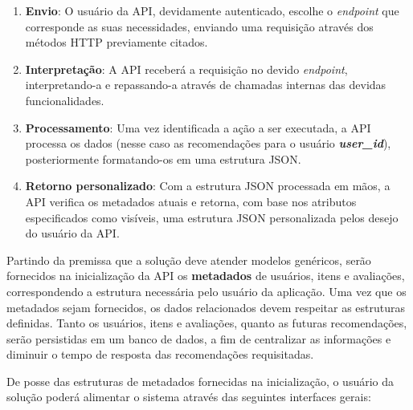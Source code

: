 \documentclass[12pt, openright, oneside, a4paper, brazil]{abntex2}
\begin{document}
\begin{enumerate}
	\item \textbf{Envio}: O usuário da API, devidamente autenticado, escolhe o \textit{endpoint} que corresponde as suas necessidades, enviando uma requisição através dos métodos HTTP previamente citados.

	\item \textbf{Interpretação}: A API receberá a requisição no devido \textit{endpoint}, interpretando-a e repassando-a através de chamadas internas das devidas funcionalidades.

	\item \textbf{Processamento}: Uma vez identificada a ação a ser executada, a API processa os dados (nesse caso as recomendações para o usuário \textbf{\textit{user\_id}}), posteriormente formatando-os em uma estrutura JSON.

	\item \textbf{Retorno personalizado}: Com a estrutura JSON processada em mãos, a API verifica os metadados atuais e retorna, com base nos atributos especificados como visíveis, uma estrutura JSON personalizada pelos desejo do usuário da API.
\end{enumerate}

Partindo da premissa que a solução deve atender modelos genéricos, serão fornecidos na inicialização da API os \textbf{metadados} de usuários, itens e avaliações, correspondendo a estrutura necessária pelo usuário da aplicação. Uma vez que os metadados sejam fornecidos, os dados relacionados devem respeitar as estruturas definidas. Tanto os usuários, itens e avaliações, quanto as futuras recomendações, serão persistidas em um banco de dados, a fim de centralizar as informações e diminuir o tempo de resposta das recomendações requisitadas.

De posse das estruturas de metadados fornecidas na inicialização, o usuário da solução poderá alimentar o sistema através das seguintes interfaces gerais:
\end{document}
